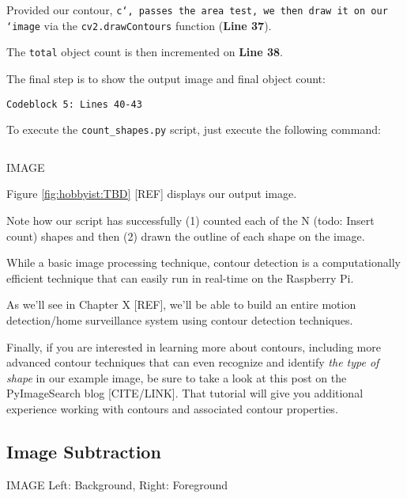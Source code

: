 Provided our contour, \texttt{c`, passes the area test, we then draw it on our `image} via the \texttt{cv2.drawContours} function (\textbf{Line 37}).

The \texttt{total} object count is then incremented on \textbf{Line 38}.

The final step is to show the output image and final object count:

\begin{verbatim}
Codeblock 5: Lines 40-43
\end{verbatim}

To execute the \texttt{count_shapes.py} script, just execute the following command:

\begin{verbatim}

\end{verbatim}

IMAGE

Figure \ref{fig:hobbyist:TBD} [REF] displays our output image.

Note how our script has successfully (1) counted each of the N (todo: Insert count) shapes and then (2) drawn the outline of each shape on the image.

While a basic image processing technique, contour detection is a computationally efficient technique that can easily run in real-time on the Raspberry Pi.

As we’ll see in Chapter X [REF], we’ll be able to build an entire motion detection/home surveillance system using contour detection techniques.

Finally, if you are interested in learning more about contours, including more advanced contour techniques that can even recognize and identify \textit{the type of shape} in our example image, be sure to take a look at this post on the PyImageSearch blog [CITE/LINK]. That tutorial will give you additional experience working with contours and associated contour properties.


\subsection{Image Subtraction}

IMAGE Left: Background, Right: Foreground

